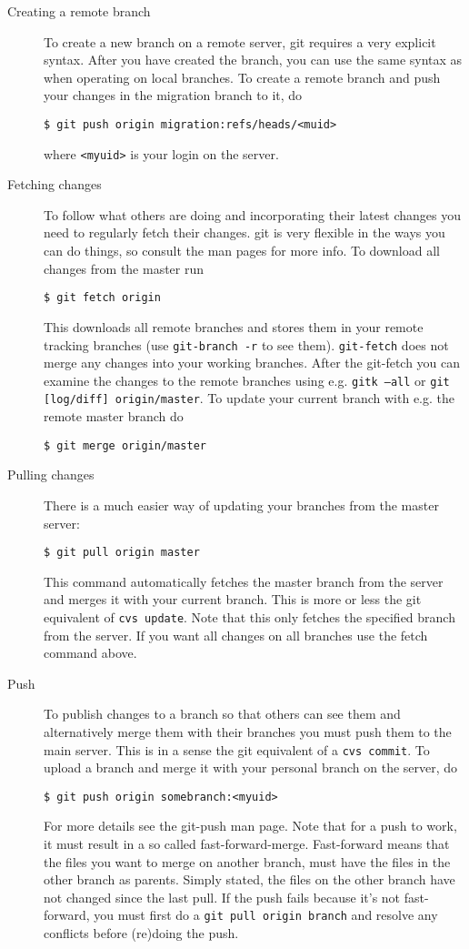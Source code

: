 \documentclass[a4paper,10pt]{article}
\begin{document}
\begin{description}
\item[Creating a remote branch] To create a new branch on a remote server, git
requires a very explicit syntax. After you have created the branch, you can
use the same syntax as when operating on local branches. To create a remote 
branch and push your changes in the migration branch to it, do
\begin{verbatim}
$ git push origin migration:refs/heads/<muid>
\end{verbatim}
where {\tt <myuid>} is your login on the server.

\item[Fetching changes] To follow what others are doing and incorporating
their latest changes you need to regularly fetch their changes. git is very
flexible in the ways you can do things, so consult the man pages for more
info. To download all changes from the master run
\begin{verbatim}
$ git fetch origin 
\end{verbatim}
This downloads all remote branches and stores them in your remote tracking
branches (use {\tt git-branch -r} to see them). {\tt git-fetch} does not merge any changes
into your working branches. After the git-fetch you can examine the changes to
the remote branches using e.g. {\tt gitk --all} or 
{\tt git [log/diff] origin/master}.
To update your current branch with e.g. the remote master branch do
\begin{verbatim}
$ git merge origin/master
\end{verbatim}

\item[Pulling changes] There is a much easier way of updating your branches
from the master server:
\begin{verbatim}
$ git pull origin master
\end{verbatim}
This command automatically fetches the master branch from the server and
merges it with your current branch. This is more or less the git equivalent of
{\tt cvs update}. Note that this only fetches the specified branch from the
server. If you want all changes on all branches use the fetch command above.

\item[Push] To publish changes to a branch so that others can see them and
alternatively merge them with their branches you must push them to the main
server. This is in a sense the git equivalent of a {\tt cvs commit}. 
To upload a
branch and merge it with your personal branch on the server, do
\begin{verbatim}
$ git push origin somebranch:<myuid>
\end{verbatim}
For more details see the git-push man page. Note that for a push to work, it
must result in a so called fast-forward-merge. Fast-forward means that the
files you want to merge on another branch, must have the files in the other
branch as parents. Simply stated, the files on the other branch have not
changed since the last pull.  If the push fails because it's not fast-forward,
you must first do a {\tt git pull origin branch} and resolve any conflicts 
before
(re)doing the push.


\end{description}
\end{document}
